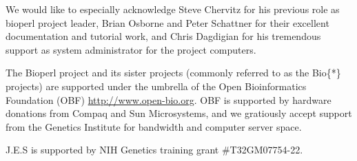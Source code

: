 \documentclass[12pt]{article}
\begin{document}
We would like to especially acknowledge Steve Chervitz for his
previous role as bioperl project leader, Brian Osborne and Peter
Schattner for their excellent documentation and tutorial work, and
Chris Dagdigian for his tremendous support as system administrator for
the project computers. 

The Bioperl project and its sister projects (commonly referred to as
the Bio\{*\} projects) are supported under the umbrella of the Open
Bioinformatics Foundation (OBF) \url{http://www.open-bio.org}.
OBF is supported by hardware donations from Compaq and Sun
Microsystems, and we gratiously accept support from the Genetics
Institute for bandwidth and computer server space.

J.E.S is supported by NIH Genetics training grant \#T32GM07754-22.

 
\end{document}
